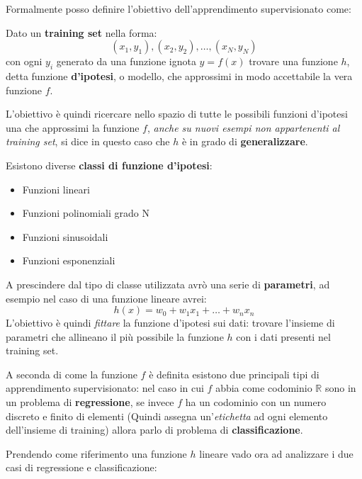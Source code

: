\documentclass[../../main.tex]{subfiles}
\begin{document}
    Formalmente posso definire l'obiettivo dell'apprendimento supervisionato come:
    
    \begin{dfn}
        Dato un \textbf{training set} nella forma:
        \[(x_1, y_1), (x_2, y_2), \dots, (x_N, y_N)\]
        con ogni $y_i$ generato da una funzione ignota $y = f(x)$ trovare una funzione $h$, detta funzione \textbf{d'ipotesi}, o modello, che approssimi in modo accettabile la vera funzione $f$.
    \end{dfn}

    L'obiettivo è quindi ricercare nello spazio di tutte le possibili funzioni d'ipotesi una che approssimi la funzione $f$, \textit{anche su nuovi esempi non appartenenti al training set}, si dice in questo caso che $h$ è in grado di \textbf{generalizzare}.

    Esistono diverse \textbf{classi di funzione d'ipotesi}:
    \begin{itemize}
        \item Funzioni lineari
        \item Funzioni polinomiali grado N
        \item Funzioni sinusoidali
        \item Funzioni esponenziali
    \end{itemize}

    A prescindere dal tipo di classe utilizzata avrò una serie di \textbf{parametri}, ad esempio nel caso di una funzione lineare avrei:
    \[h(x) = w_0 + w_1x_1 + \dots + w_nx_n\]
    L'obiettivo è quindi \textit{fittare} la funzione d'ipotesi sui dati: trovare l'insieme di parametri che allineano il più possibile la funzione $h$ con i dati presenti nel training set. 

    A seconda di come la funzione $f$ è definita esistono due principali tipi di apprendimento supervisionato: nel caso in cui $f$ abbia come codominio $\mathbb{R}$ sono in un problema di \textbf{regressione}, se invece $f$ ha un codominio con un numero discreto e finito di elementi (Quindi assegna un'\textit{etichetta} ad ogni elemento dell'insieme di training) allora parlo di problema di \textbf{classificazione}.

    Prendendo come riferimento una funzione $h$ lineare vado ora ad analizzare i due casi di regressione e classificazione:
\end{document}
